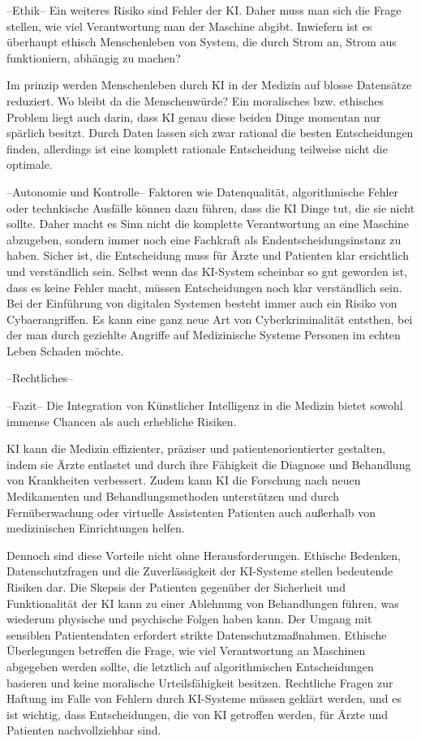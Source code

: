 --Ethik--
Ein weiteres Risiko sind Fehler der KI. Daher muss man sich die Frage stellen, wie viel Verantwortung man der Maschine abgibt.
Inwiefern ist es überhaupt ethisch Menschenleben von System, die durch Strom an, Strom aus funktioniern, abhängig zu machen?

Im prinzip werden Menschenleben durch KI in der Medizin auf blosse Datensätze reduziert. Wo bleibt da die Menschenwürde?
Ein moralisches bzw. ethisches Problem liegt auch darin, dass KI genau diese beiden Dinge momentan nur spärlich besitzt. 
Durch Daten lassen sich zwar rational  die besten Entscheidungen finden, allerdings ist eine komplett rationale Entscheidung teilweise nicht die optimale.

--Autonomie und Kontrolle--
Faktoren wie Datenqualität, algorithmische Fehler oder technkische Ausfälle können dazu führen, dass die KI Dinge tut, die sie nicht sollte. 
Daher macht es Sinn nicht die komplette Verantwortung an eine Maschine abzugeben, sondern immer noch eine Fachkraft als Endentscheidungsinstanz zu haben.
Sicher ist, die Entscheidung muss für Ärzte und Patienten klar ersichtlich und verständlich sein. Selbst wenn das KI-System scheinbar so gut geworden ist, dass es keine Fehler macht, 
müssen Entscheidungen noch klar verständlich sein. Bei der Einführung von digitalen Systemen besteht immer auch ein  Risiko von Cybaerangriffen.
Es kann eine ganz neue Art von Cyberkriminalität entsthen, bei der man durch geziehlte Angriffe auf Medizinische Systeme Personen im echten Leben Schaden möchte.


--Rechtliches--





--Fazit--
Die Integration von Künstlicher Intelligenz in die Medizin bietet sowohl immense Chancen als auch erhebliche Risiken. 

KI kann die Medizin effizienter, präziser und patientenorientierter gestalten, indem sie Ärzte entlastet und durch ihre Fähigkeit die Diagnose und Behandlung von Krankheiten verbessert. 
Zudem kann KI die Forschung nach neuen Medikamenten und Behandlungsmethoden unterstützen und durch Fernüberwachung oder virtuelle Assistenten Patienten auch außerhalb von medizinischen Einrichtungen helfen.

Dennoch sind diese Vorteile nicht ohne Herausforderungen. Ethische Bedenken, Datenschutzfragen und die Zuverlässigkeit der KI-Systeme stellen bedeutende Risiken dar. 
Die Skepsis der Patienten gegenüber der Sicherheit und Funktionalität der KI kann zu einer Ablehnung von Behandlungen führen, was wiederum physische und psychische Folgen haben kann. 
Der Umgang mit sensiblen Patientendaten erfordert strikte Datenschutzmaßnahmen.
Ethische Überlegungen betreffen die Frage, wie viel Verantwortung an Maschinen abgegeben werden sollte, die letztlich auf algorithmischen Entscheidungen basieren und keine moralische Urteilsfähigkeit besitzen. 
Rechtliche Fragen zur Haftung im Falle von Fehlern durch KI-Systeme müssen geklärt werden, und es ist wichtig, dass Entscheidungen, die von KI getroffen werden, für Ärzte und Patienten nachvollziehbar sind.

